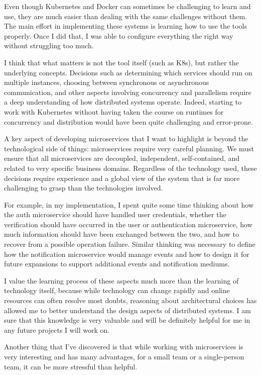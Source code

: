 \documentclass[manuscript,screen,review]{acmart}
\begin{document}
Even though Kubernetes and Docker can sometimes be challenging to learn and use, they are much easier than dealing with the same challenges without them. The main effort in implementing these systems is learning how to use the tools properly. Once I did that, I was able to configure everything the right way without struggling too much. 

I think that what matters is not the tool itself (such as K8s), but rather the underlying concepts. Decisions such as determining which services should run on multiple instances, choosing between synchronous or asynchronous communication, and other aspects involving concurrency and parallelism require a deep understanding of how distributed systems operate. Indeed, starting to work with Kubernetes without having taken the course on runtimes for concurrency and distribution would have been quite challenging and error-prone.


A key aspect of developing microservices that I want to highlight is beyond the technological side of things: microservices require very careful planning. We must ensure that all microservices are decoupled, independent, self-contained, and related to very specific business domains. Regardless of the technology used, these decisions require experience and a global view of the system that is far more challenging to grasp than the technologies involved.

For example, in my implementation, I spent quite some time thinking about how the auth microservice should have handled user credentials, whether the verification should have occurred in the user or authentication microservice, how much information should have been exchanged between the two, and how to recover from a possible operation failure. Similar thinking was necessary to define how the notification microservice would manage events and how to design it for future expansions to support additional events and notification mediums.

I value the learning process of these aspects much more than the learning of technology itself, because while technology can change rapidly and online resources can often resolve most doubts, reasoning about architectural choices has allowed me to better understand the design aspects of distributed systems. I am sure that this knowledge is very valuable and will be definitely helpful for me in any future projects I will work on.

Another thing that I've discovered is that while working with microservices is very interesting and has many advantages, for a small team or a single-person team, it can be more stressful than helpful.
\end{document}
